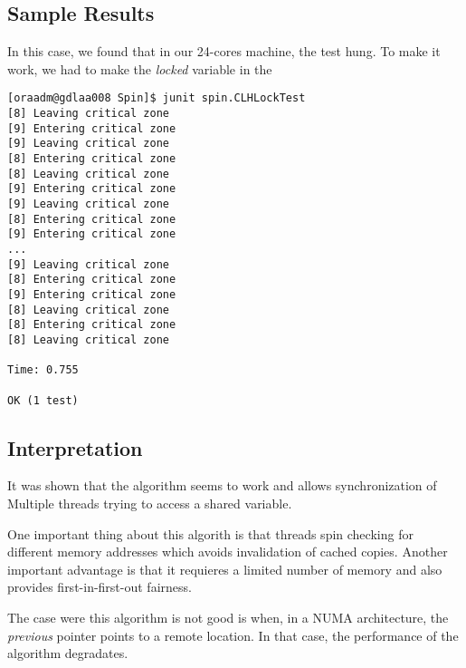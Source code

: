 \subsection{Sample Results}
\par
In this case, we found that in our 24-cores machine, the test hung. To make it
work, we had to make the \textit{locked} variable in the 
\par
\hfill
\begin{verbatim}
[oraadm@gdlaa008 Spin]$ junit spin.CLHLockTest 
[8] Leaving critical zone
[9] Entering critical zone
[9] Leaving critical zone
[8] Entering critical zone
[8] Leaving critical zone
[9] Entering critical zone
[9] Leaving critical zone
[8] Entering critical zone
[9] Entering critical zone
...
[9] Leaving critical zone
[8] Entering critical zone
[9] Entering critical zone
[8] Leaving critical zone
[8] Entering critical zone
[8] Leaving critical zone

Time: 0.755

OK (1 test)
\end{verbatim}
\hfill
\par
\subsection{Interpretation}
It was shown that the algorithm seems to work and allows synchronization of
Multiple threads trying to access a shared variable.
\par
One important thing about this algorith is that threads spin checking for
different memory addresses which avoids invalidation of cached copies. Another
important advantage is that it requieres a limited number of memory and also
provides first-in-first-out fairness. 
\par
The case were this algorithm is not good is when, in a NUMA architecture, the
\textit{previous} pointer points to a remote location. In that case, the
performance of the algorithm degradates.
